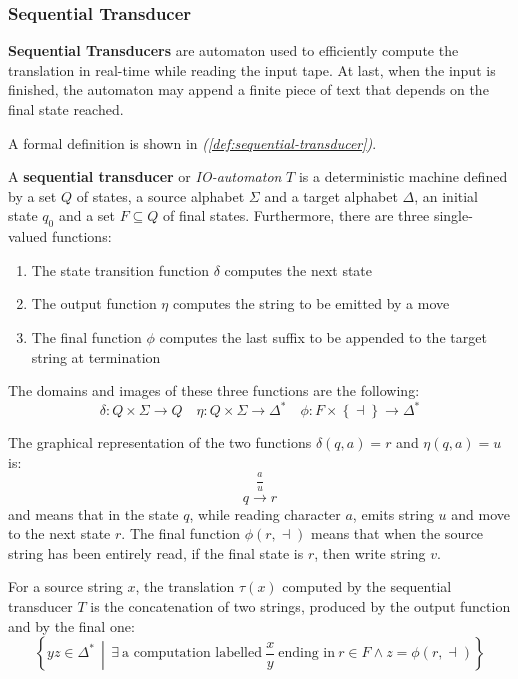 \documentclass[english]{article}
\begin{document}
\subsubsection{Sequential Transducer}

\textbf{Sequential Transducers} are automaton used to efficiently compute the translation in real-time while reading the input tape.
At last, when the input is finished, the automaton may append a finite piece of text that depends on the final state reached.

A formal definition is shown in \textit{(\ref{def:sequential-transducer})}.

\begin{definition}
  \label{def:sequential-transducer}
  A \textbf{sequential transducer} or \textit{IO-automaton} \(T\) is a deterministic machine defined by a set \(Q\) of states, a source alphabet \(\Sigma\) and a target alphabet \(\Delta\), an initial state \(q_0\) and a set \(F \subseteq Q\) of final states.
  Furthermore, there are three single-valued functions:

  \begin{enumerate}
    \item The state transition function \(\delta\) computes the next state
    \item The output function \(\eta\) computes the string to be emitted by a move
    \item The final function \(\phi\) computes the last suffix to be appended to the target string at termination
  \end{enumerate}

  The domains and images of these three functions are the following:
  \[ \delta: Q \times \Sigma \rightarrow Q \quad \eta: Q \times \Sigma \rightarrow \Delta^\ast \quad \phi : F \times \left\{ \dashv \right\} \rightarrow \Delta^\ast \]
\end{definition}

The graphical representation of the two functions \(\delta(q, a) = r\) and \(\eta(q, a) = u\) is:
\[ q \xrightarrow{\dfrac{a}{u}} r \]
and means that in the state \(q\), while reading character \(a\), emits string \(u\) and move to the next state \(r\).
The final function \(\phi(r, \dashv)\) means that when the source string has been entirely read, if the final state is \(r\), then write string \(v\).

For a source string \(x\), the translation \(\tau(x)\) computed by the sequential transducer \(T\) is the concatenation of two strings, produced by the output function and by the final one:
\[ \left\{ yz \in \Delta^\ast \, \middle\vert \, \exists \ \text{a computation labelled} \ \dfrac{x}{y} \ \text{ending in} \ r \in F \land z = \phi\left( r, \dashv \right) \right\} \]
\end{document}
